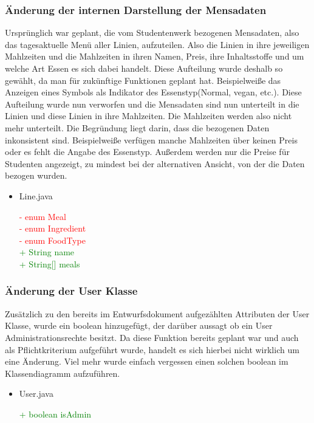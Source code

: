 \documentclass[a4paper]{scrreprt}
\begin{document}
\subsubsection{Änderung der internen Darstellung der Mensadaten}
Ursprünglich war geplant, die vom Studentenwerk bezogenen Mensadaten, also das tagesaktuelle Menü aller Linien, aufzuteilen. Also die Linien in ihre jeweiligen Mahlzeiten und die Mahlzeiten in ihren Namen, Preis, ihre Inhaltsstoffe und um welche Art Essen es sich dabei handelt. Diese Aufteilung wurde deshalb so gewählt, da man für zukünftige Funktionen geplant hat. Beispielweiße das Anzeigen eines Symbols als Indikator des Essenstyp(Normal, vegan, etc.). Diese Aufteilung wurde nun verworfen und die Mensadaten sind nun unterteilt in die Linien und diese Linien in ihre Mahlzeiten. Die Mahlzeiten werden also nicht mehr unterteilt. Die Begründung liegt darin, dass die bezogenen Daten inkonsistent sind. Beispielweiße verfügen manche Mahlzeiten über keinen Preis oder es fehlt die Angabe des Essenstyp. Außerdem werden nur die Preise für Studenten angezeigt, zu mindest bei der alternativen Ansicht, von der die Daten bezogen wurden.


\begin{itemize}
\item{Line.java}

\textcolor{red}{- enum Meal} \\
\textcolor{red}{- enum Ingredient} \\
\textcolor{red}{- enum FoodType} \\
\textcolor{green}{+ String name} \\
\textcolor{green}{+ String[] meals}\\
\end{itemize}

\subsubsection{Änderung der User Klasse}
Zusätzlich zu den bereits im Entwurfsdokument aufgezählten Attributen der User Klasse, wurde ein boolean hinzugefügt, der darüber aussagt ob ein User Administrationsrechte besitzt. Da diese Funktion bereits geplant war und auch als Pflichtkriterium aufgeführt wurde, handelt es sich hierbei nicht wirklich um eine Änderung. Viel mehr wurde einfach vergessen einen solchen boolean im Klassendiagramm aufzuführen.

\begin{itemize}
\item{User.java}

\textcolor{green}{+ boolean isAdmin}\\
\end{itemize}
\end{document}
